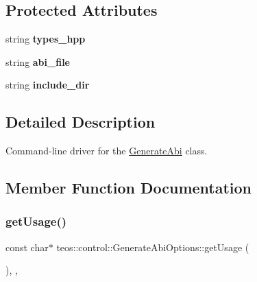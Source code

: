\subsection*{Protected Attributes}
\begin{DoxyCompactItemize}
\item 
\mbox{\label{classteos_1_1control_1_1_generate_abi_options_a661e9e486d3bc90fd0bff3cffdf125e5}} 
string {\bfseries types\+\_\+hpp}
\item 
\mbox{\label{classteos_1_1control_1_1_generate_abi_options_a038e318e87dd16fbbdf30ec4611d7622}} 
string {\bfseries abi\+\_\+file}
\item 
\mbox{\label{classteos_1_1control_1_1_generate_abi_options_ac5c99cb639c2ef403673bf8e02c11baf}} 
string {\bfseries include\+\_\+dir}
\end{DoxyCompactItemize}


\subsection{Detailed Description}
Command-\/line driver for the \mbox{\hyperlink{classteos_1_1control_1_1_generate_abi}{Generate\+Abi}} class. 

\subsection{Member Function Documentation}
\mbox{\label{classteos_1_1control_1_1_generate_abi_options_a7d2ce1ad86518ee06e0bc5ffbe104b39}} 
\subsubsection{\texorpdfstring{get\+Usage()}{getUsage()}}
{\footnotesize\ttfamily const char$\ast$ teos\+::control\+::\+Generate\+Abi\+Options\+::get\+Usage (\begin{DoxyParamCaption}{ }\end{DoxyParamCaption})\hspace{0.3cm}{\ttfamily [inline]}, {\ttfamily [protected]}, {\ttfamily [virtual]}}



